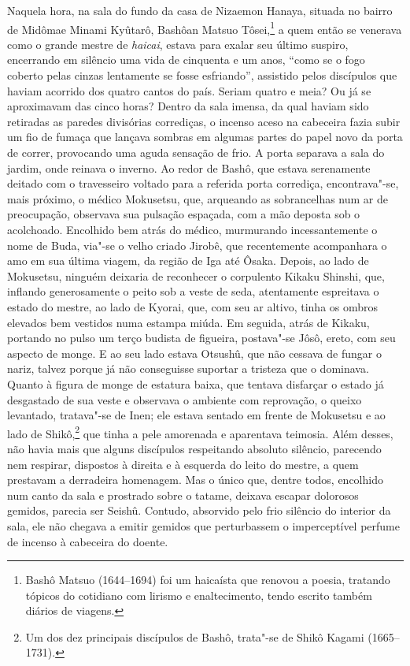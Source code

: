 Naquela hora, na sala do fundo da casa de Nizaemon Hanaya, situada no
bairro de Midômae Minami Kyûtarô, Bashôan Matsuo Tôsei,\footnote{ Bashô Matsuo 
(1644--1694) foi um haicaísta que renovou a poesia, tratando tópicos do
cotidiano com lirismo e enaltecimento, tendo escrito também diários de
viagens.} a quem então se venerava como o grande mestre de \emph{haicai},
estava para exalar seu último suspiro, encerrando em silêncio uma vida
de cinquenta e um anos, ``como se o fogo coberto pelas
cinzas lentamente se fosse esfriando'', assistido pelos
discípulos que haviam acorrido dos quatro cantos do país. Seriam quatro
e meia? Ou já se aproximavam das cinco horas? Dentro da sala imensa, da
qual haviam sido retiradas as paredes divisórias corrediças, o incenso
aceso na cabeceira fazia subir um fio de fumaça que lançava sombras em
algumas partes do papel novo da porta de correr, provocando uma aguda
sensação de frio. A porta separava a sala do jardim, onde reinava o
inverno. Ao redor de Bashô, que estava serenamente deitado com o
travesseiro voltado para a referida porta corrediça, encontrava"-se,
mais próximo, o médico Mokusetsu, que, arqueando as sobrancelhas num ar
de preocupação, observava sua pulsação espaçada, com a mão deposta sob
o acolchoado. Encolhido bem atrás do médico, murmurando incessantemente
o nome de Buda, via"-se o velho criado Jirobê, que recentemente
acompanhara o amo em sua última viagem, da região de Iga até Ôsaka.
Depois, ao lado de Mokusetsu, ninguém deixaria de reconhecer o
corpulento Kikaku Shinshi, que, inflando generosamente o peito sob a
veste de seda, atentamente espreitava o estado do mestre, ao lado de
Kyorai, que, com seu ar altivo, tinha os ombros elevados bem vestidos
numa estampa miúda. Em seguida, atrás de Kikaku, portando no pulso um
terço budista de figueira, postava"-se Jôsô, ereto, com seu aspecto de
monge. E ao seu lado estava Otsushû, que não cessava de fungar o nariz,
talvez porque já não conseguisse suportar a tristeza que o dominava.
Quanto à figura de monge de estatura baixa, que tentava disfarçar o
estado já desgastado de sua veste e observava o ambiente com
reprovação, o queixo levantado, tratava"-se de Inen; ele estava sentado
em frente de Mokusetsu e ao lado de Shikô,\footnote{ Um dos dez
principais discípulos de Bashô, trata"-se de Shikô Kagami (1665--1731).}
que tinha a pele amorenada e aparentava teimosia. Além desses, não
havia mais que alguns discípulos respeitando absoluto silêncio,
parecendo nem respirar, dispostos à direita e à esquerda do leito do
mestre, a quem prestavam a derradeira homenagem. Mas o único que,
dentre todos, encolhido num canto da sala e prostrado sobre o tatame,
deixava escapar dolorosos gemidos, parecia ser Seishû. Contudo,
absorvido pelo frio silêncio do interior da sala, ele não chegava a
emitir gemidos que perturbassem o imperceptível perfume de incenso à
cabeceira do doente.

